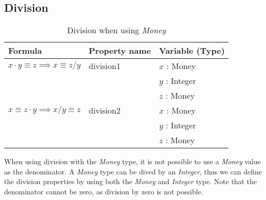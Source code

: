 \subsection*{Division}
\label{ssct:properties_division}
\begin{table}[!ht]
\centering
\begin{tabular}{lll}
\hline
                        \textbf{Formula}                             & \textbf{Property name} & \textbf{Variable (Type)} \\ \hline
\rowcolor[HTML]{EFEFEF} $x \cdot y \equiv z \implies x \equiv z / y$ & division1              & $x$ : Money              \\
\rowcolor[HTML]{EFEFEF}                                              &                        & $y$ : Integer            \\
\rowcolor[HTML]{EFEFEF}                                              &                        & $z$ : Money              \\
                        $x \equiv z \cdot y \implies x / y \equiv z$ & division2              & $x$ : Money              \\
                                                                     &                        & $y$ : Integer            \\
                                                                     &                        & $z$ : Money              \\ \hline
\end{tabular}
\caption{Division when using \textit{Money}}
\label{tbl:ch4_money_division}
\end{table}
\FloatBarrier\noindent
When using division with the \textit{Money} type, it is not possible to use a
\textit{Money} value as the denominator. A \textit{Money} type can be dived by
an \textit{Integer}, thus we can define the division properties by using both
the \textit{Money} and \textit{Integer} type. Note that the denominator cannot
be zero, as division by zero is not possible. %

